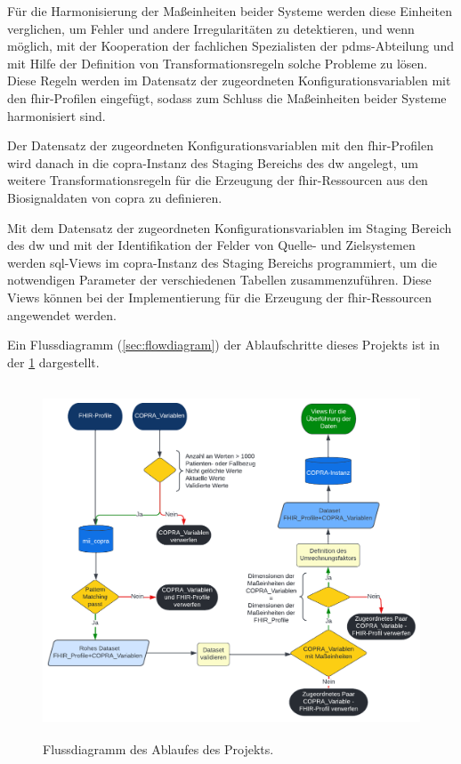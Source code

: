 Für die Harmonisierung der Maßeinheiten beider Systeme werden diese Einheiten verglichen, um Fehler und andere Irregularitäten zu detektieren, und wenn möglich, mit der Kooperation der fachlichen Spezialisten der \ac{pdms}-Abteilung und mit Hilfe der Definition von Transformationsregeln solche Probleme zu lösen. Diese Regeln werden im Datensatz der zugeordneten Konfigurationsvariablen mit den \ac{fhir}-Profilen eingefügt, sodass zum Schluss die Maßeinheiten beider Systeme harmonisiert sind.

Der Datensatz der zugeordneten Konfigurationsvariablen mit den \ac{fhir}-Profilen wird danach in die \ac{copra}-Instanz des Staging Bereichs des \ac{dw} angelegt, um weitere Transformationsregeln für die Erzeugung der \ac{fhir}-Ressourcen aus den Biosignaldaten von \ac{copra} zu definieren.

Mit dem Datensatz der zugeordneten Konfigurationsvariablen im Staging Bereich des \ac{dw} und mit der Identifikation der Felder von Quelle- und Zielsystemen werden \ac{sql}-Views im \ac{copra}-Instanz des Staging Bereichs programmiert, um die notwendigen Parameter der verschiedenen Tabellen zusammenzuführen. Diese Views können bei der Implementierung für die Erzeugung der \ac{fhir}-Ressourcen angewendet werden.

Ein Flussdiagramm (\ref{sec:flowdiagram}) der Ablaufschritte dieses Projekts ist in der \ref{fig:flowdiagram} dargestellt.


\begin{figure}[ht]
	\centering
	\includegraphics[height=10.5cm]{figures/thesis_flow}
	\caption[Flussdiagramm des Ablaufes des Projekts]{Flussdiagramm des Ablaufes des Projekts.}
	\label{fig:flowdiagram}
\end{figure}